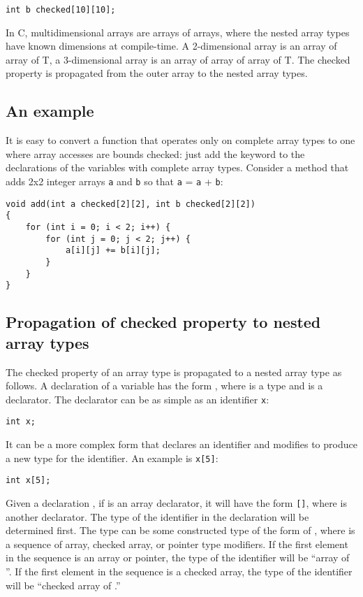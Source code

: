 \begin{verbatim}
int b checked[10][10];
\end{verbatim}

In C, multidimensional arrays are arrays of arrays,
where the nested array types have known dimensions at compile-time. A
2-dimensional array is an array of array of T, a 3-dimensional array is
an array of array of array of T. The checked property is propagated from the
outer array to the nested array types.

\subsection{An example}

It is easy to convert a function that operates only on complete array
types to one where array accesses are bounds checked: just add the
 keyword to the declarations of the variables with complete array
types. Consider a method that adds 2x2 integer arrays \texttt{a} and
\texttt{b} so that \texttt{a} = \texttt{a} + \texttt{b}:

\begin{verbatim}
void add(int a checked[2][2], int b checked[2][2])
{
    for (int i = 0; i < 2; i++) {
        for (int j = 0; j < 2; j++) {
            a[i][j] += b[i][j];
        }
    }
}
\end{verbatim}

\subsection{Propagation of checked property to nested array types}
The checked property of an array type is propagated to a nested array type as follows.
A declaration of a variable has the form  ,
where  is a type and  is a declarator. The declarator
can be as simple as an identifier \texttt{x}:
\begin{verbatim}
int x;
\end{verbatim}
It can be a more complex form that declares an identifier and modifies 
to produce a new type for the identifier. An example is \texttt{x[5]}:
\begin{verbatim}
int x[5];
\end{verbatim}

Given a declaration  , if  is an array
declarator, it will have the form
\texttt{[]},
where  is another declarator. The type of the identifier in the
declaration  will be determined first. The type can be some
constructed type of the form  of , where
 is a sequence of array, checked array, or pointer
type modifiers. If the first element in the 
sequence is an array or pointer, the type of the identifier will be
 ``array of  ''. If the first element in the
 sequence is a checked array, the type of the
identifier will be  ``checked array of .''

